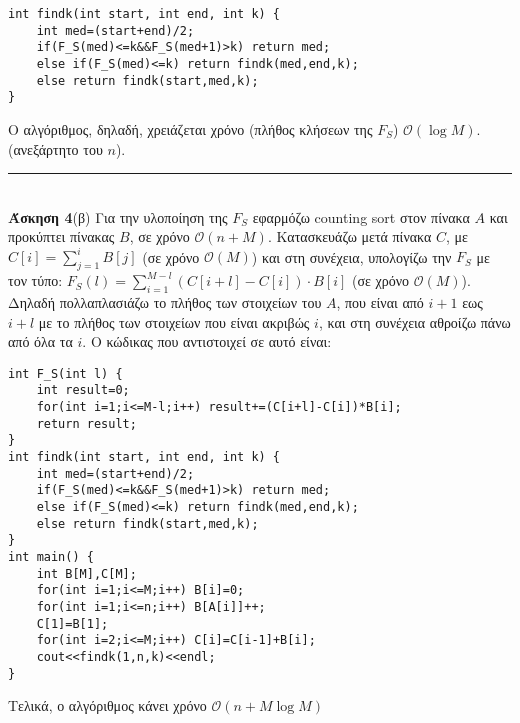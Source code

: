 \documentclass[12pt]{article}
\newcommand\en[1]{\latintext #1\greektext}
\newcommand\bigOh{\mathcal{O}}
\newcommand{\HRule}{\rule{\linewidth}{0.1mm}}
\begin{document}
\latintext
\begin{lstlisting}
int findk(int start, int end, int k) {
	int med=(start+end)/2;
	if(F_S(med)<=k&&F_S(med+1)>k) return med;
	else if(F_S(med)<=k) return findk(med,end,k);
	else return findk(start,med,k);
}
\end{lstlisting}
\greektext
Ο αλγόριθμος, δηλαδή, χρειάζεται χρόνο (πλήθος κλήσεων της $F_S$) $\bigOh\left(\log M\right)$. (ανεξάρτητο του $n$).\\
\HRule\\
{\bf Άσκηση 4}(β) Για την υλοποίηση της $F_S$ εφαρμόζω \en{counting sort} στον πίνακα $A$ και προκύπτει πίνακας $B$, σε χρόνο $\bigOh\left(n+M\right)$. Κατασκευάζω μετά πίνακα $C$, με $C[i]=\sum_{j=1}^iB[j]$ (σε χρόνο $\bigOh\left(M\right)$) και στη συνέχεια, υπολογίζω την $F_S$ με τον τύπο: $F_S\left(l\right)=\sum_{i=1}^{M-l}\left(C[i+l]-C[i]\right)\cdot B[i]$ (σε χρόνο $\bigOh\left(M\right)$). Δηλαδή πολλαπλασιάζω το πλήθος των στοιχείων του $A$, που είναι από $i+1$ εως $i+l$ με το πλήθος των στοιχείων που είναι ακριβώς $i$, και στη συνέχεια αθροίζω πάνω από όλα τα $i$. Ο κώδικας που αντιστοιχεί σε αυτό είναι:
\latintext
\begin{lstlisting}
int F_S(int l) {
	int result=0;
	for(int i=1;i<=M-l;i++) result+=(C[i+l]-C[i])*B[i];
	return result;
}
int findk(int start, int end, int k) {
	int med=(start+end)/2;
	if(F_S(med)<=k&&F_S(med+1)>k) return med;
	else if(F_S(med)<=k) return findk(med,end,k);
	else return findk(start,med,k);
}
int main() {
	int B[M],C[M];
	for(int i=1;i<=M;i++) B[i]=0;
	for(int i=1;i<=n;i++) B[A[i]]++;
	C[1]=B[1];
	for(int i=2;i<=M;i++) C[i]=C[i-1]+B[i];
	cout<<findk(1,n,k)<<endl;
}
\end{lstlisting}
\greektext
Τελικά, ο αλγόριθμος κάνει χρόνο $\bigOh\left(n+M\log M\right)$
\end{document}

